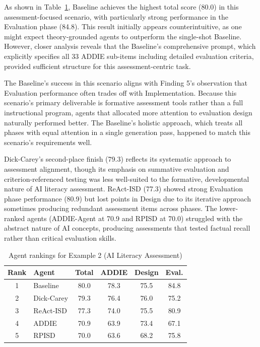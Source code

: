 As shown in Table~\ref{tab:example2}, Baseline achieves the highest total score (80.0) in this assessment-focused scenario, with particularly strong performance in the Evaluation phase (84.8). This result initially appears counterintuitive, as one might expect theory-grounded agents to outperform the single-shot Baseline. However, closer analysis reveals that the Baseline's comprehensive prompt, which explicitly specifies all 33 ADDIE sub-items including detailed evaluation criteria, provided sufficient structure for this assessment-centric task.

The Baseline's success in this scenario aligns with Finding 5's observation that Evaluation performance often trades off with Implementation. Because this scenario's primary deliverable is formative assessment tools rather than a full instructional program, agents that allocated more attention to evaluation design naturally performed better. The Baseline's holistic approach, which treats all phases with equal attention in a single generation pass, happened to match this scenario's requirements well.

Dick-Carey's second-place finish (79.3) reflects its systematic approach to assessment alignment, though its emphasis on summative evaluation and criterion-referenced testing was less well-suited to the formative, developmental nature of AI literacy assessment. ReAct-ISD (77.3) showed strong Evaluation phase performance (80.9) but lost points in Design due to its iterative approach sometimes producing redundant assessment items across phases. The lower-ranked agents (ADDIE-Agent at 70.9 and RPISD at 70.0) struggled with the abstract nature of AI concepts, producing assessments that tested factual recall rather than critical evaluation skills.

\begin{table}[ht!]
\centering
\small
\caption{Agent rankings for Example 2 (AI Literacy Assessment)}
\label{tab:example2}
\begin{tabular}{clcccc}
\toprule
\textbf{Rank} & \textbf{Agent} & \textbf{Total} & \textbf{ADDIE} & \textbf{Design} & \textbf{Eval.} \\
\midrule
1 & Baseline & 80.0 & 78.3 & 75.5 & 84.8 \\
2 & Dick-Carey & 79.3 & 76.4 & 76.0 & 75.2 \\
3 & ReAct-ISD & 77.3 & 74.0 & 75.5 & 80.9 \\
4 & ADDIE & 70.9 & 63.9 & 73.4 & 67.1 \\
5 & RPISD & 70.0 & 63.6 & 68.2 & 75.8 \\
\bottomrule
\end{tabular}
\end{table}

